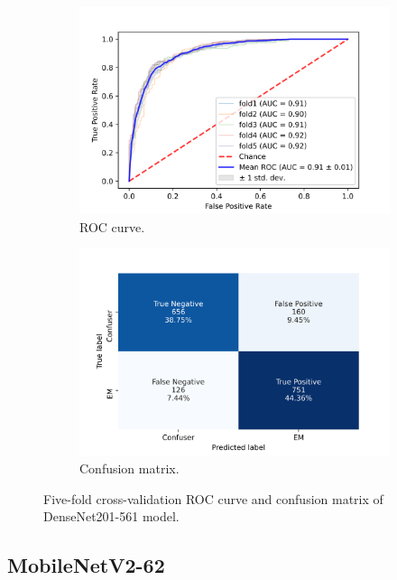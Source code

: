 \begin{figure}[h!]
	\centering
	\begin{subfigure}[b]{0.49\textwidth}
		\centering
		\includegraphics[width=\textwidth,keepaspectratio]{images/Supplement4/image136.png}
		\caption{ROC curve.}
	\end{subfigure}
	\hfill
	\begin{subfigure}[b]{0.49\textwidth}
		\centering
		\includegraphics[width=\textwidth,keepaspectratio]{images/Supplement4/image142.png}
		\caption{Confusion matrix.}
	\end{subfigure}
	\caption{Five-fold cross-validation ROC curve and confusion matrix of DenseNet201-561 model.}
\end{figure}

\vfill\clearpage
\subsection{MobileNetV2-62}

